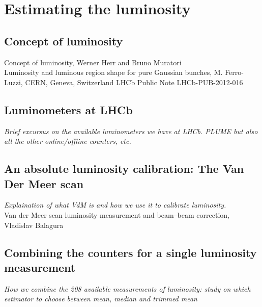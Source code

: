 \chapter{Estimating the luminosity}
\section{Concept of luminosity}
Concept of luminosity,  Werner Herr and Bruno Muratori\\
Luminosity and luminous region shape for pure Gaussian bunches, M. Ferro-Luzzi, CERN, Geneva, Switzerland LHCb Public Note LHCb-PUB-2012-016

\section{Luminometers at LHCb}
\textit{Brief excursus on the available luminometers we have at LHCb. PLUME but also all the other online/offline counters, etc.}
\section{An absolute luminosity calibration: The Van Der Meer scan}
\textit{Explaination of what VdM is and how we use it to calibrate luminosity.}\\
Van der Meer scan luminosity measurement and beam–beam correction, Vladislav Balagura

\section{Combining the counters for a single luminosity measurement}
\textit{How we combine the 208 available measurements of luminosity: study on which estimator to choose between mean, median and trimmed mean}